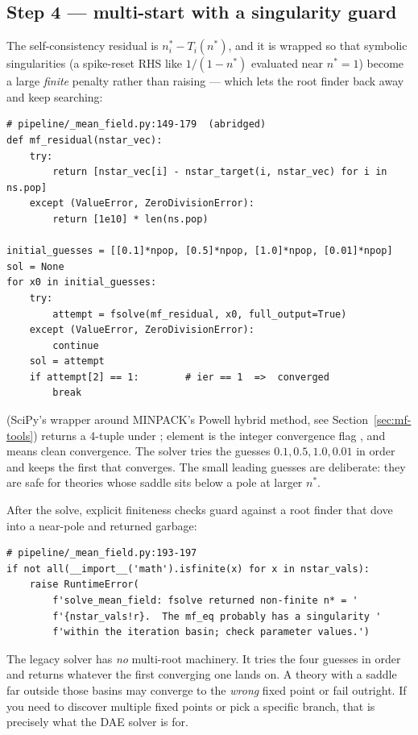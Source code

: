 \subsection{Step 4 --- multi-start  with a singularity guard}

The self-consistency residual is $n^{*}_i - T_i(n^{*})$, and it is wrapped so that
symbolic singularities (a spike-reset RHS like $1/(1-n^{*})$ evaluated near
$n^{*}=1$) become a large \emph{finite} penalty rather than raising --- which lets
the root finder back away and keep searching:

\begin{lstlisting}
# pipeline/_mean_field.py:149-179  (abridged)
def mf_residual(nstar_vec):
    try:
        return [nstar_vec[i] - nstar_target(i, nstar_vec) for i in ns.pop]
    except (ValueError, ZeroDivisionError):
        return [1e10] * len(ns.pop)

initial_guesses = [[0.1]*npop, [0.5]*npop, [1.0]*npop, [0.01]*npop]
sol = None
for x0 in initial_guesses:
    try:
        attempt = fsolve(mf_residual, x0, full_output=True)
    except (ValueError, ZeroDivisionError):
        continue
    sol = attempt
    if attempt[2] == 1:        # ier == 1  =>  converged
        break
\end{lstlisting}

 (SciPy's wrapper around MINPACK's Powell hybrid method, see
Section~\ref{sec:mf-tools}) returns a 4-tuple under ;
element \code{[2]} is the integer convergence flag , and 
means clean convergence. The solver tries the guesses $0.1, 0.5, 1.0, 0.01$ in
order and keeps the first that converges. The small leading guesses are
deliberate: they are safe for theories whose saddle sits below a pole at larger
$n^{*}$.

After the solve, explicit finiteness checks guard against a root finder that dove
into a near-pole and returned garbage:

\begin{lstlisting}
# pipeline/_mean_field.py:193-197
if not all(__import__('math').isfinite(x) for x in nstar_vals):
    raise RuntimeError(
        f'solve_mean_field: fsolve returned non-finite n* = '
        f'{nstar_vals!r}.  The mf_eq probably has a singularity '
        f'within the iteration basin; check parameter values.')
\end{lstlisting}

\begin{gotcha}
The legacy solver has \emph{no} multi-root machinery. It tries the four guesses
in order and returns whatever the first converging one lands on. A theory with a
saddle far outside those basins may converge to the \emph{wrong} fixed point or
fail outright. If you need to discover multiple fixed points or pick a specific
branch, that is precisely what the DAE solver is for.
\end{gotcha}

